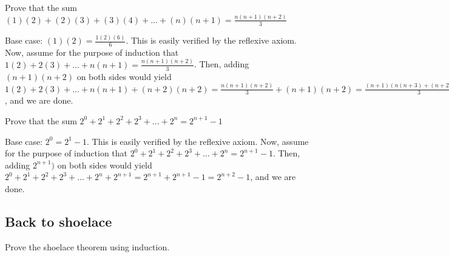 \documentclass[11pt]{article}
\begin{document}
\begin{problem}
Prove that the sum $(1)(2) + (2)(3) + (3)(4) + ... + (n)(n+1) = \frac{n(n+1)(n+2)}{3}$
\end{problem}

\begin{solution}
Base case: $(1)(2)=\frac{1(2)(6)}{6}$. This is easily verified by the reflexive axiom. Now, assume for the purpose of induction that $1(2)+2(3)+...+n(n+1) = \frac{n(n+1)(n+2)}{3}$. Then, adding $(n+1)(n+2)$ on both sides would yield $1(2)+2(3)+...+n(n+1)+(n+2)(n+2) = \frac{n(n+1)(n+2)}{3} + (n+1)(n+2) = \frac{(n+1)(n(n+3) + (n+2)(3))}{3} = \frac{(n+1)(n+2)(n+3)}{3}$, and we are done.
\end{solution}

\begin{problem}
Prove that the sum $2^0 + 2^1 + 2^2 + 2^3 + ... + 2^n = 2^{n+1} - 1$
\end{problem}

\begin{solution}
Base case: $2^0=2^1-1$. This is easily verified by the reflexive axiom. Now, assume for the purpose of induction that $2^0 + 2^1 + 2^2 + 2^3 + ... + 2^n = 2^{n+1} - 1$. Then, adding $2^{n+1})$ on both sides would yield $2^0 + 2^1 + 2^2 + 2^3 + ... + 2^n + 2^{n+1} = 2^{n+1} +2^{n+1} - 1 = 2^{n+2} - 1$, and we are done.
\end{solution}

\subsection{Back to shoelace}

\begin{problem}
Prove the shoelace theorem using induction.
\end{problem}


\begin{solution}

\end{solution}
\end{document}
